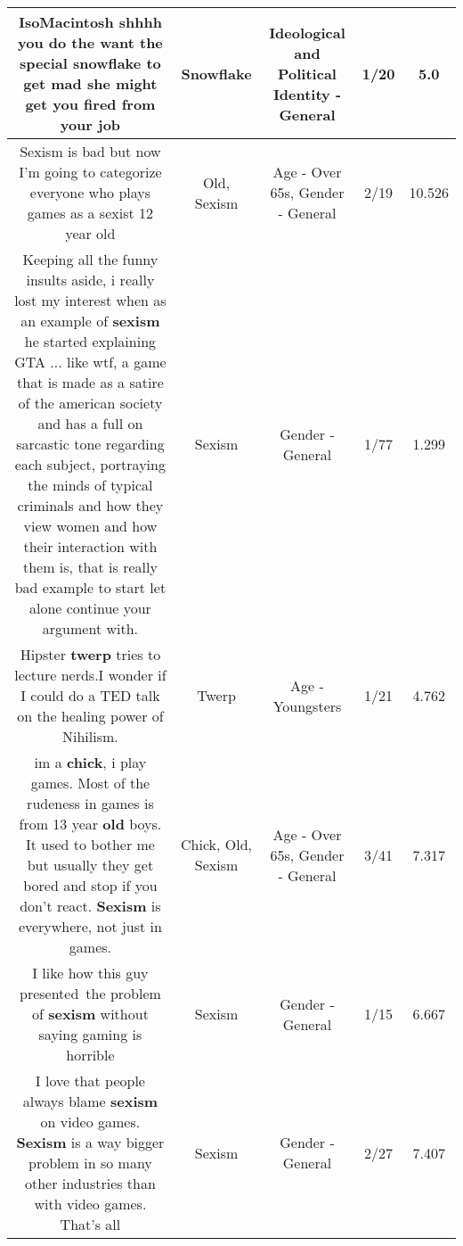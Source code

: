 \documentclass[11pt]{article}
\newlength\mylength
\begin{document}
\begin{center}
\begin{longtable}{|C{.65\mylength}|C{.30\mylength}|C{.12\mylength}|C{.12\mylength}|C{.12\mylength}|}
  \small IsoMacintosh shhhh you do the want the special \textbf{snowflake} to get mad she might get you fired from your job\normalsize   & Snowflake &  Ideological and Political Identity - General & 1/20 & 5.0 \\  \hline
  \small Sexism is bad but now I'm going to categorize everyone who plays games as a sexist 12 year old\normalsize   & Old, Sexism & Age - Over 65s, Gender - General & 2/19 & 10.526 \\  \hline
  \small Keeping all the funny insults aside, i really lost my interest when as an example of \textbf{sexism} he started explaining GTA ... like wtf, a game that is made as a satire of the american society and has a full on sarcastic tone regarding each subject, portraying the minds of typical criminals and how they view women and how their interaction with them is, that is really bad example to start let alone continue your argument with.\normalsize   & Sexism & Gender - General & 1/77 & 1.299 \\  \hline
  \small Hipster \textbf{twerp} tries to lecture nerds.I wonder if I could do a TED talk on the healing power of Nihilism.\normalsize   & Twerp & Age - Youngsters & 1/21 & 4.762 \\  \hline
  \small im a \textbf{chick}, i play games. Most of the rudeness in games is from 13 year \textbf{old} boys. It used to bother me but usually they get bored and stop if you don't react. \textbf{Sexism} is everywhere, not just in games.\normalsize   & Chick, Old, Sexism & Age - Over 65s, Gender - General & 3/41 & 7.317 \\  \hline
  \small I like how this guy presented the problem of \textbf{sexism} without saying gaming is horrible\normalsize   & Sexism & Gender - General & 1/15 & 6.667 \\  \hline
  \small I love that people always blame \textbf{sexism} on video games. \textbf{Sexism} is a way bigger problem in so many other industries than with video games. That's all\normalsize   & Sexism & Gender - General & 2/27 & 7.407 \\  \hline

\end{longtable}
\end{center}
\end{document}
